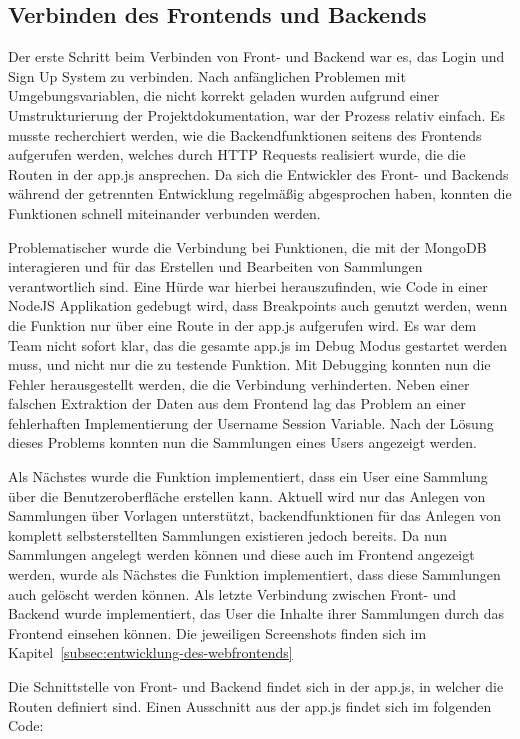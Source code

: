 \subsection{Verbinden des Frontends und Backends}\label{subsec:verbinden-des-frontends-und-backends}

Der erste Schritt beim Verbinden von Front- und Backend war es, das Login und Sign Up System zu verbinden.
Nach anfänglichen Problemen mit Umgebungsvariablen, die nicht korrekt geladen wurden aufgrund einer Umstrukturierung der Projektdokumentation, war der Prozess relativ einfach.
Es musste recherchiert werden, wie die Backendfunktionen seitens des Frontends aufgerufen werden, welches durch HTTP Requests realisiert wurde, die die Routen in der app.js ansprechen.
Da sich die Entwickler des Front- und Backends während der getrennten Entwicklung regelmäßig abgesprochen haben, konnten die Funktionen schnell miteinander verbunden werden.

Problematischer wurde die Verbindung bei Funktionen, die mit der MongoDB interagieren und für das Erstellen und Bearbeiten von Sammlungen verantwortlich sind.
Eine Hürde war hierbei herauszufinden, wie Code in einer NodeJS Applikation gedebugt wird, dass Breakpoints auch genutzt werden, wenn die Funktion nur über eine Route in der app.js aufgerufen wird.
Es war dem Team nicht sofort klar, das die gesamte app.js im Debug Modus gestartet werden muss, und nicht nur die zu testende Funktion.
Mit Debugging konnten nun die Fehler herausgestellt werden, die die Verbindung verhinderten.
Neben einer falschen Extraktion der Daten aus dem Frontend lag das Problem an einer fehlerhaften Implementierung der Username Session Variable.
Nach der Lösung dieses Problems konnten nun die Sammlungen eines Users angezeigt werden.

Als Nächstes wurde die Funktion implementiert, dass ein User eine Sammlung über die Benutzeroberfläche erstellen kann.
Aktuell wird nur das Anlegen von Sammlungen über Vorlagen unterstützt, backendfunktionen für das Anlegen von komplett selbsterstellten Sammlungen existieren jedoch bereits.
Da nun Sammlungen angelegt werden können und diese auch im Frontend angezeigt werden, wurde als Nächstes die Funktion implementiert, dass diese Sammlungen auch gelöscht werden können.
Als letzte Verbindung zwischen Front- und Backend wurde implementiert, das User die Inhalte ihrer Sammlungen durch das Frontend einsehen können.
Die jeweiligen Screenshots finden sich im Kapitel~\ref{subsec:entwicklung-des-webfrontends}

Die Schnittstelle von Front- und Backend findet sich in der app.js, in welcher die Routen definiert sind.
Einen Ausschnitt aus der app.js findet sich im folgenden Code:


